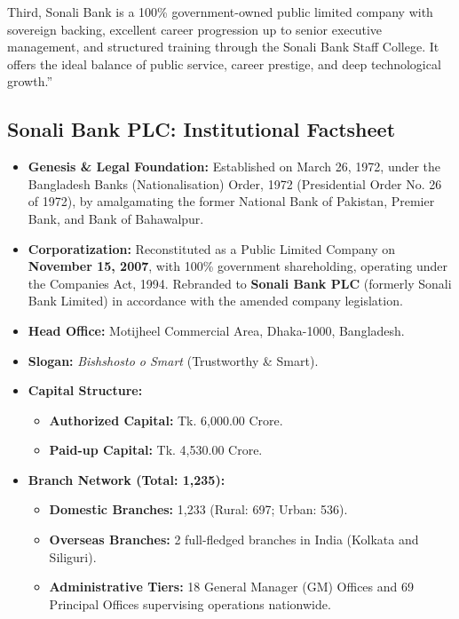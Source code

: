 Third, Sonali Bank is a 100\% government-owned public limited company with sovereign backing, excellent career progression up to senior executive management, and structured training through the Sonali Bank Staff College. It offers the ideal balance of public service, career prestige, and deep technological growth.''

\medskip

\subsection{Sonali Bank PLC: Institutional Factsheet}

\begin{itemize}
  \item \textbf{Genesis \& Legal Foundation:} Established on March 26, 1972, under the Bangladesh Banks (Nationalisation) Order, 1972 (Presidential Order No. 26 of 1972), by amalgamating the former National Bank of Pakistan, Premier Bank, and Bank of Bahawalpur.
  \item \textbf{Corporatization:} Reconstituted as a Public Limited Company on \textbf{November 15, 2007}, with 100\% government shareholding, operating under the Companies Act, 1994. Rebranded to \textbf{Sonali Bank PLC} (formerly Sonali Bank Limited) in accordance with the amended company legislation.
  \item \textbf{Head Office:} Motijheel Commercial Area, Dhaka-1000, Bangladesh.
  \item \textbf{Slogan:} \textit{Bishshosto o Smart} (Trustworthy \& Smart).
  \item \textbf{Capital Structure:}
  \begin{itemize}
    \item \textbf{Authorized Capital:} Tk. 6,000.00 Crore.
    \item \textbf{Paid-up Capital:} Tk. 4,530.00 Crore.
  \end{itemize}
  \item \textbf{Branch Network (Total: 1,235):}
  \begin{itemize}
    \item \textbf{Domestic Branches:} 1,233 (Rural: 697; Urban: 536).
    \item \textbf{Overseas Branches:} 2 full-fledged branches in India (Kolkata and Siliguri).
    \item \textbf{Administrative Tiers:} 18 General Manager (GM) Offices and 69 Principal Offices supervising operations nationwide.
  \end{itemize}

\end{itemize}
